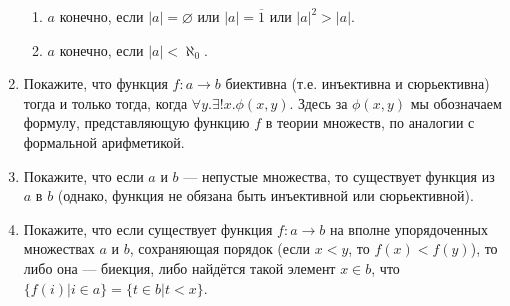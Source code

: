 \documentclass[10pt,a4paper,oneside]{article}
\begin{document}
\begin{enumerate}
\begin{enumerate}
\item $a$ конечно, если $|a|=\varnothing$ или $|a|=\overline{1}$ или $|a|^2 > |a|$.
\item $a$ конечно, если $|a|<\aleph_0$.
\end{enumerate}
\item Покажите, что функция $f: a \rightarrow b$ биективна (т.е. инъективна и сюрьективна) тогда и только тогда,
когда $\forall y.\exists!x.\phi(x,y)$. Здесь за $\phi(x,y)$ мы обозначаем формулу, представляющую функцию $f$
в теории множеств, по аналогии с формальной арифметикой.
\item Покажите, что если $a$ и $b$ --- непустые множества, то существует функция из $a$ в $b$ 
(однако, функция не обязана быть инъективной или сюрьективной).
\item Покажите, что если существует функция $f: a \rightarrow b$ на вполне упорядоченных множествах $a$ и $b$, 
сохраняющая порядок (если $x < y$, то $f(x) < f(y)$), то либо она --- биекция, либо найдётся 
такой элемент $x \in b$, что $\{f(i)|i \in a\} = \{t \in b | t < x\}$.
\end{enumerate}
\end{document}
